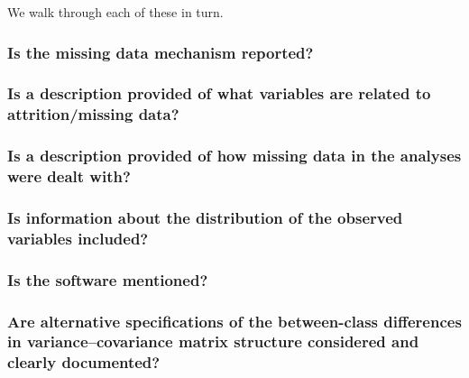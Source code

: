 \documentclass[man]{apa6}
\begin{document}
\hypertarget{htmlwidget-31a3e9100620ea87273d}{}

We walk through each of these in turn.

\hypertarget{is-the-missing-data-mechanism-reported}{%
\subsubsection{Is the missing data mechanism reported?}\label{is-the-missing-data-mechanism-reported}}

\hypertarget{is-a-description-provided-of-what-variables-are-related-to-attritionmissing-data}{%
\subsubsection{Is a description provided of what variables are related to attrition/missing data?}\label{is-a-description-provided-of-what-variables-are-related-to-attritionmissing-data}}

\hypertarget{is-a-description-provided-of-how-missing-data-in-the-analyses-were-dealt-with}{%
\subsubsection{Is a description provided of how missing data in the analyses were dealt with?}\label{is-a-description-provided-of-how-missing-data-in-the-analyses-were-dealt-with}}

\hypertarget{is-information-about-the-distribution-of-the-observed-variables-included}{%
\subsubsection{Is information about the distribution of the observed variables included?}\label{is-information-about-the-distribution-of-the-observed-variables-included}}

\hypertarget{is-the-software-mentioned}{%
\subsubsection{Is the software mentioned?}\label{is-the-software-mentioned}}

\hypertarget{are-alternative-specifications-of-the-between-class-differences-in-variancecovariance-matrix-structure-considered-and-clearly-documented}{%
\subsubsection{Are alternative specifications of the between-class differences in variance--covariance matrix structure considered and clearly documented?}\label{are-alternative-specifications-of-the-between-class-differences-in-variancecovariance-matrix-structure-considered-and-clearly-documented}}
\end{document}
